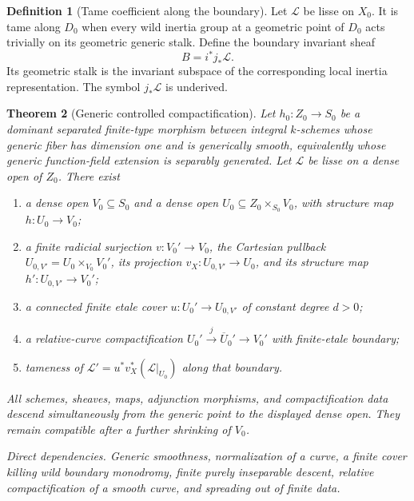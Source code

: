 \documentclass[10pt]{article}
\newtheorem{theorem}{Theorem}[section]
\theoremstyle{definition}
\newtheorem{definition}[theorem]{Definition}
\newcommand{\dep}[1]{\par\smallskip\noindent\textit{Direct dependencies.} #1\par}
\begin{document}
\begin{definition}[Tame coefficient along the boundary]
Let \(\mathcal L\) be lisse on \(X_0\).  It is tame along \(D_0\) when every
wild inertia group at a geometric point of \(D_0\) acts trivially on its
geometric generic stalk.  Define the boundary invariant sheaf
\[
                         B=i^*j_*\mathcal L.
\]
Its geometric stalk is the invariant subspace of the corresponding local
inertia representation.  The symbol \(j_*\mathcal L\) is underived.
\end{definition}

\begin{theorem}[Generic controlled compactification]
Let \(h_0:Z_0\to S_0\) be a dominant separated finite-type morphism between
integral \(k\)-schemes whose generic fiber has dimension one and is
generically smooth, equivalently whose generic function-field extension is
separably generated.  Let
\(\mathcal L\) be lisse on a dense open of \(Z_0\).  There exist
\begin{enumerate}[label=\textup{(\roman*)}]
\item a dense open \(V_0\subseteq S_0\) and a dense open
      \(U_0\subseteq Z_0\times_{S_0}V_0\), with structure map
      \(h:U_0\to V_0\);
\item a finite radicial surjection \(v:V_0'\to V_0\), the Cartesian pullback
      \(U_{0,V'}=U_0\times_{V_0}V_0'\), its projection
      \(v_X:U_{0,V'}\to U_0\), and its structure map
      \(h':U_{0,V'}\to V_0'\);
\item a connected finite etale cover
      \(u:U_0'\to U_{0,V'}\) of constant degree \(d>0\);
\item a relative-curve compactification
      \(U_0'\xrightarrow j\overline U_0'\to V_0'\)
      with finite-etale boundary;
\item tameness of
      \(\mathcal L'=u^*v_X^*(\mathcal L|_{U_0})\) along that boundary.
\end{enumerate}
All schemes, sheaves, maps, adjunction morphisms, and compactification data
descend simultaneously from the generic point to the displayed dense open.
They remain compatible after a further shrinking of \(V_0\).
\dep{Generic smoothness, normalization of a curve, a finite cover killing
wild boundary monodromy, finite purely inseparable descent, relative
compactification of a smooth curve, and spreading out of finite data.}
\end{theorem}
\end{document}
